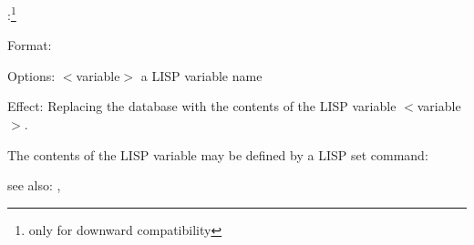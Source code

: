 \lreplace:\footnote{only for downward compatibility}

Format: 

Options: $<$variable$>$ a LISP variable name

Effect: Replacing the database  with the contents of the 
	LISP variable $<$variable$>$.

	The contents of the LISP variable may be defined by a
	LISP set command:


see also: \destroy, \lconsult
